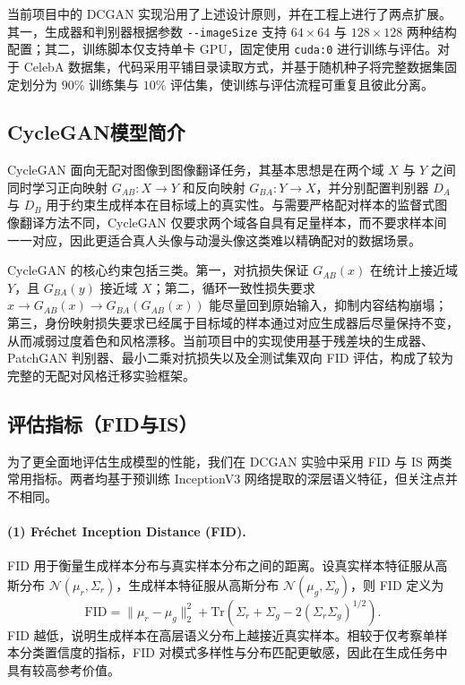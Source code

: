 \documentclass[12pt, a4paper, UTF8]{ctexart}
\begin{document}
当前项目中的 DCGAN 实现沿用了上述设计原则，并在工程上进行了两点扩展。其一，生成器和判别器根据参数 \verb|--imageSize| 支持 $64\times64$ 与 $128\times128$ 两种结构配置；其二，训练脚本仅支持单卡 GPU，固定使用 \verb|cuda:0| 进行训练与评估。对于 CelebA 数据集，代码采用平铺目录读取方式，并基于随机种子将完整数据集固定划分为 $90\%$ 训练集与 $10\%$ 评估集，使训练与评估流程可重复且彼此分离。

\subsection{CycleGAN模型简介}

CycleGAN 面向无配对图像到图像翻译任务，其基本思想是在两个域 $X$ 与 $Y$ 之间同时学习正向映射 $G_{AB}: X \rightarrow Y$ 和反向映射 $G_{BA}: Y \rightarrow X$，并分别配置判别器 $D_A$ 与 $D_B$ 用于约束生成样本在目标域上的真实性\cite{zhu2017cyclegan}。与需要严格配对样本的监督式图像翻译方法不同，CycleGAN 仅要求两个域各自具有足量样本，而不要求样本间一一对应，因此更适合真人头像与动漫头像这类难以精确配对的数据场景。

CycleGAN 的核心约束包括三类。第一，对抗损失保证 $G_{AB}(x)$ 在统计上接近域 $Y$，且 $G_{BA}(y)$ 接近域 $X$；第二，循环一致性损失要求 $x \rightarrow G_{AB}(x) \rightarrow G_{BA}(G_{AB}(x))$ 能尽量回到原始输入，抑制内容结构崩塌；第三，身份映射损失要求已经属于目标域的样本通过对应生成器后尽量保持不变，从而减弱过度着色和风格漂移。当前项目中的实现使用基于残差块的生成器、PatchGAN 判别器、最小二乘对抗损失以及全测试集双向 FID 评估，构成了较为完整的无配对风格迁移实验框架。

\subsection{评估指标（FID与IS）}

为了更全面地评估生成模型的性能，我们在 DCGAN 实验中采用 FID 与 IS 两类常用指标。两者均基于预训练 InceptionV3 网络提取的深层语义特征，但关注点并不相同。

\paragraph{(1) Fr\'echet Inception Distance (FID).}
FID 用于衡量生成样本分布与真实样本分布之间的距离\cite{heusel2017fid}。设真实样本特征服从高斯分布 $\mathcal{N}(\mu_r, \Sigma_r)$，生成样本特征服从高斯分布 $\mathcal{N}(\mu_g, \Sigma_g)$，则 FID 定义为
\begin{equation}
\mathrm{FID} = \|\mu_r - \mu_g\|_2^2 +
\mathrm{Tr}\left(\Sigma_r + \Sigma_g - 2(\Sigma_r \Sigma_g)^{1/2}\right).
\end{equation}
FID 越低，说明生成样本在高层语义分布上越接近真实样本。相较于仅考察单样本分类置信度的指标，FID 对模式多样性与分布匹配更敏感，因此在生成任务中具有较高参考价值。
\end{document}
